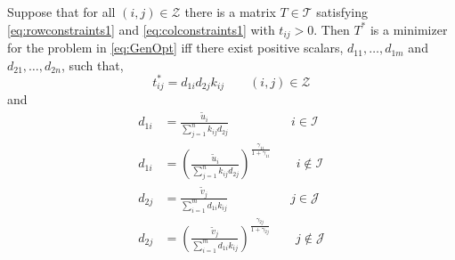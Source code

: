 \documentclass[10pt,a4paper]{amsart}
\begin{document}
\begin{lemma}
\label{lem:lem2b}
Suppose that for all $(i,j) \in {\mathcal Z}$ there is a matrix $T\in {\mathcal T}$ satisfying \eqref{eq:rowconstraints1} and  \eqref{eq:colconstraints1} with $t_{ij} >0$.
Then $T^*$ is a minimizer for the problem in  \eqref{eq:GenOpt}   iff
there exist    positive scalars, $d_{11}, \dots,  d_{1m}$ and $d_{21},\dots, d_{2n}$,  such that, 
\begin{equation}
t^*_{ij} = d_{1i} d_{2j}k_{ij}   \qquad (i, j)
\in  \mathcal{Z}
\label{eq:TKscale2}
\end{equation}
and
\begin{align}
 d_{1i} &=\frac{ \tilde{u}_i} {\sum_{j=1}^n  k_{ij} d_{2j}}	\qquad \qquad \quad i\in {\mathcal I}
 \label{eq:d1i}\\
  d_{1i} &= \left( \frac{ \tilde{u}_i} {\sum_{j=1}^n  k_{ij} d_{2j}}\right)^{\frac{\gamma_{1i}}{1+\gamma_{1i}}}
  \qquad i \notin {\mathcal I}
  \label{eq:d1i2}\\
  d_{2j} &= \frac{ \tilde{v}_j}{\sum_{i=1}^m  d_{1i} k_{ij}}	
  \qquad \qquad \quad j\in {\mathcal J}	 \label{eq:d2j}\\
d_{2j} &= \left(\frac{ \tilde{v}_j}{\sum_{i=1}^m  d_{1i} k_{ij}}\right)^{\frac{\gamma_{2j}}{1+\gamma_{2j}}}
  \qquad j \notin {\mathcal J}
    \label{eq:d2j2}
\end{align}

\end{lemma}
\end{document}
